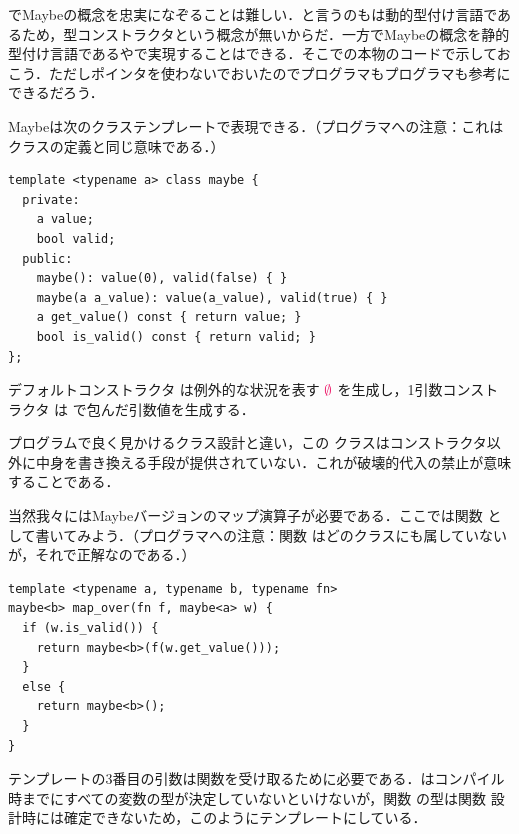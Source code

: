 \documentclass[a5paper,twoside,fleqn,draft]{jsbook}
\begin{document}
\python でMaybeの概念を忠実になぞることは難しい．と言うのも\python は動的型付け言語であるため，型コンストラクタという概念が無いからだ．一方でMaybeの概念を静的型付け言語である\cxx や\java で実現することはできる．そこで\cxx の本物のコードで示しておこう．ただしポインタを使わないでおいたので\cxx プログラマも\java プログラマも参考にできるだろう．

Maybeは次のクラステンプレートで表現できる．（\java プログラマへの注意：これはクラスの定義と同じ意味である．）
\begin{cxxcode}
\begin{verbatim}
template <typename a> class maybe {
  private:
    a value;
    bool valid;
  public:
    maybe(): value(0), valid(false) { }
    maybe(a a_value): value(a_value), valid(true) { }
    a get_value() const { return value; }
    bool is_valid() const { return valid; }
};
\end{verbatim}
\end{cxxcode}
デフォルトコンストラクタ  は例外的な状況を表す $\hNothing$ を生成し，1引数コンストラクタ  は  で包んだ引数値を生成する．

\cxx プログラムで良く見かけるクラス設計と違い，この  クラスはコンストラクタ以外に中身を書き換える手段が提供されていない．これが破壊的代入の禁止が意味することである．

当然我々にはMaybeバージョンのマップ演算子が必要である．ここでは関数  として書いてみよう．（\java プログラマへの注意：関数  はどのクラスにも属していないが，それで正解なのである．）
\begin{cxxcode}
\begin{verbatim}
template <typename a, typename b, typename fn>
maybe<b> map_over(fn f, maybe<a> w) {
  if (w.is_valid()) {
    return maybe<b>(f(w.get_value()));
  }
  else {
    return maybe<b>();
  }
}
\end{verbatim}
\end{cxxcode}
テンプレートの3番目の引数は関数を受け取るために必要である．\cxx はコンパイル時までにすべての変数の型が決定していないといけないが，関数  の型は関数  設計時には確定できないため，このようにテンプレートにしている．
\end{document}

